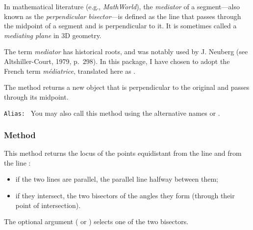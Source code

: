In mathematical literature (e.g., \textit{MathWorld}), the \emph{mediator} of a segment—also known as the \emph{perpendicular bisector}—is defined as the line that passes through the midpoint of a segment and is perpendicular to it. It is sometimes called a \emph{mediating plane} in 3D geometry.

The term \emph{mediator} has historical roots, and was notably used by J. Neuberg (see Altshiller-Court, 1979, p.~298). In this package, I have chosen to adopt the French term \emph{médiatrice}, translated here as .

\medskip

The method returns a new  object that is perpendicular to the original and passes through its midpoint.

\medskip

\texttt{Alias: } You may also call this method using the alternative names  or .

\vspace{1em}
\begin{tkzexample}[latex=.5\textwidth]
\begin{center}
\end{center}
\end{tkzexample}


\subsubsection{Method }
\label{ssub:method_line_equidistant_with}

This method returns the locus of the points equidistant from the line and from
the line :
\begin{itemize}
  \item if the two lines are parallel, the parallel line halfway between them;
  \item if they intersect, the two bisectors of the angles they form (through
        their point of intersection).
\end{itemize}
The optional argument  ( or ) selects one of the two
bisectors.

